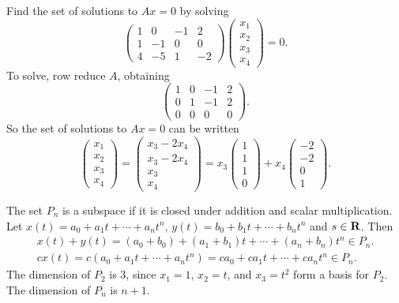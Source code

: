 \documentclass{ximera}
\begin{document}
\soln Find the set of solutions to $Ax = 0$ by solving
\[
\left(\begin{array}{rrrr} 1 & 0 & -1 & 2 \\ 1 & -1 & 0 & 0 \\ 4
& -5 & 1 & -2 \end{array}\right) \left(\begin{array}{r} x_1 \\ x_2
\\ x_3 \\ x_4 \end{array}\right) = 0.
\]
To solve, row reduce $A$, obtaining
\[
\left(\begin{array}{rrrr} 1 & 0 & -1 & 2 \\ 0 & 1 & -1 & 2 \\ 0
& 0 & 0 & 0 \end{array}\right).
\]
So the set of solutions to $Ax = 0$ can be written
\[
\left(\begin{array}{r} x_1 \\ x_2 \\ x_3 \\ x_4
\end{array}\right) = \left(\begin{array}{c} x_3 - 2x_4 \\ x_3 - 2x_4
\\ x_3 \\ x_4 \end{array}\right) = x_3\left(\begin{array}{r} 1 \\ 1
\\ 1 \\ 0 \end{array}\right) + x_4\left(\begin{array}{r} -2 \\ -2
\\ 0 \\ 1 \end{array}\right).
\]

The set $P_n$ is a subspace if it is closed under addition and
scalar multiplication.  Let $x(t) = a_0 + a_1t + \cdots +
a_nt^n$, $y(t) = b_0 + b_1t + \cdots + b_nt^n$ and $s \in \mbox{$\bf{R}$}$.
Then
\[
\begin{array}{l}
x(t) + y(t) = (a_0 + b_0) + (a_1 + b_1)t + \cdots + (a_n + b_n)t^n \in P_n.
\\
cx(t) = c(a_0 + a_1t + \cdots + a_nt^n) = ca_0 + ca_1t + \cdots + ca_nt^n
\in P_n.
\end{array}
\]
The dimension of $P_2$ is 3, since $x_1 = 1$, $x_2 = t$, and
$x_3 = t^2$ form a basis for $P_2$.  The dimension of $P_n$ is
$n + 1$.
\end{document}
